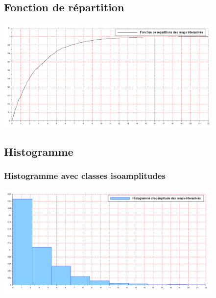 \documentclass{article}
\begin{document}
\subsection{Fonction de répartition}
\begin{center}
\includegraphics[width=425px]{img/repart.png}
\end{center}
\paragraph{}

\subsection{Histogramme}

\subsubsection{Histogramme avec classes isoamplitudes}
\begin{center}
\includegraphics[width=425px]{img/H_isoa.png}
\end{center}
\paragraph{}
\end{document}
